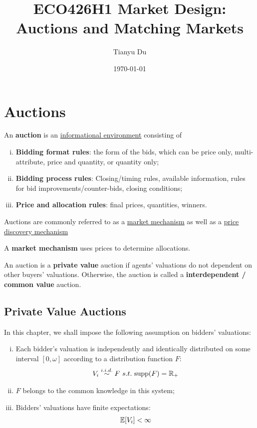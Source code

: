 \documentclass{article}
\title{ECO426H1 Market Design: Auctions and Matching Markets}
\author{Tianyu Du}
\date{\today}
\begin{document}
	\maketitle
	\tableofcontents
	
	\newpage
	
	\section{Auctions}
	\begin{definition}
		An \textbf{auction} is an \ul{informational environment} consisting of
		\begin{enumerate}[(i)]
			\item \textbf{Bidding format rules}: the form of the bids, which can be price only, multi-attribute, price and quantity, or quantity only;
			\item \textbf{Bidding process rules}: Closing/timing rules, available information, rules for bid improvements/counter-bids, closing conditions;
			\item \textbf{Price and allocation rules}: final prices, quantities, winners.
		\end{enumerate}
		Auctions are commonly referred to as a \ul{market mechanism} as well as a \ul{price discovery mechanism}
	\end{definition}
	
	\begin{definition}
		A \textbf{market mechanism} uses prices to determine allocations.
	\end{definition}

	\begin{definition}
		An auction is a \textbf{private value} auction if agents' valuations do not dependent on other buyers' valuations. Otherwise, the auction is called a \textbf{interdependent / common value} auction.
	\end{definition}
	
	\subsection{Private Value Auctions}
	
	\begin{assumption}
		In this chapter, we shall impose the following assumption on bidders' valuations:
		\begin{enumerate}[(i)]
			\item Each bidder's valuation is independently and identically distributed on some interval $[0, \omega]$ according to a distribution function $F$:
			\begin{align}
				V_i \overset{i.i.d.}{\sim} F\ s.t.\ \text{{supp}}(F) = \mathbb{R}_+
			\end{align}
			\item $F$ belongs to the common knowledge in this system;
			\item Bidders' valuations have finite expectations:
			\begin{align}
				\mathbb{E}[{V_i}] < \infty
			\end{align}
		\end{enumerate}
	\end{assumption}
	
\end{document}
